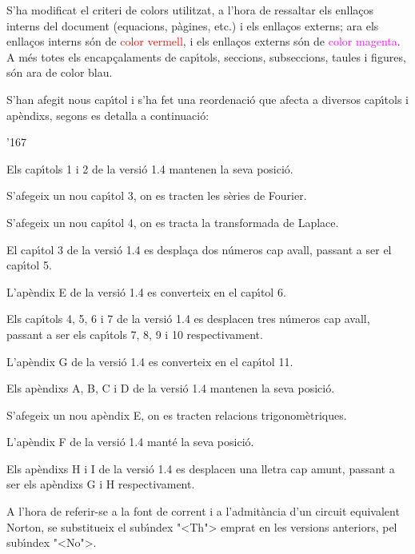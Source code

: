 S'ha modificat el criteri de colors utilitzat, a l'hora de ressaltar
els enlla\c{c}os interns del document (equacions, p\`{a}gines, etc.) i els
enlla\c{c}os externs; ara els enlla\c{c}os interns s\'{o}n de
\textcolor{red}{color vermell}, i els enlla\c{c}os externs s\'{o}n de
\textcolor{magenta}{color magenta}. A m\'{e}s totes els encap\c{c}alaments
de cap\'{\i}tols, seccions,
 subseccions, taules  i figures, s\'{o}n ara de
 \textcolor{NavyBlue}{color blau}.

S'han afegit nous cap\'{\i}tol i s'ha fet una reordenaci\'{o} que afecta a
diversos cap\'{\i}tols i ap\`{e}ndixs, segons es detalla a continuaci\'{o}:
\begin{dinglist}{'167}
   \item Els cap\'{\i}tols 1 i 2  de la versi\'{o} 1.4 mantenen la seva posici\'{o}.
   \item S'afegeix un nou cap\'{\i}tol 3, on es tracten les s\`{e}ries de Fourier.
   \item S'afegeix un nou cap\'{\i}tol 4, on es tracta la transformada de Laplace.
   \item El cap\'{\i}tol 3 de la versi\'{o} 1.4 es despla\c{c}a dos n\'{u}meros cap
    avall, passant a ser el cap\'{\i}tol 5.
   \item L'ap\`{e}ndix E de la versi\'{o} 1.4 es converteix en el cap\'{\i}tol 6.
   \item Els cap\'{\i}tols 4, 5, 6 i 7  de la versi\'{o} 1.4 es desplacen tres n\'{u}meros cap
    avall, passant a ser els cap\'{\i}tols 7, 8, 9 i 10 respectivament.
    \item L'ap\`{e}ndix G de la versi\'{o} 1.4 es converteix en el cap\'{\i}tol 11.
    \item Els ap\`{e}ndixs A, B, C i D de la versi\'{o} 1.4 mantenen la seva posici\'{o}.
    \item S'afegeix un nou ap\`{e}ndix E, on es tracten relacions trigonom\`{e}triques.
    \item L'ap\`{e}ndix F de la versi\'{o} 1.4 mant\'{e} la seva posici\'{o}.
    \item Els ap\`{e}ndixs H i I de la versi\'{o} 1.4 es desplacen una lletra cap
    amunt, passant a ser els ap\`{e}ndixs G i H respectivament.
\end{dinglist}


 A l'hora de referir-se a la font de corrent i a l'admit\`{a}ncia d'un circuit equivalent
 Norton, se substitueix el sub\'{\i}ndex {"<}Th{">} emprat en les versions
anteriors, pel sub\'{\i}ndex {"<}No{">}.

